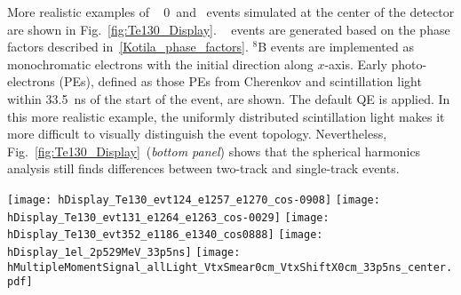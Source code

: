 More realistic examples of \Te~ 0\nbb~and \B~events simulated at the center of the detector are shown in Fig.~\ref{fig:Te130_Display}. 
\Te~ events are generated based on the phase factors described in~\ref{Kotila_phase_factors}.
$^{8}$B events are implemented as monochromatic electrons with the initial direction along $x$-axis.
Early photo-electrons (PEs), defined as those PEs from Cherenkov and scintillation light within 33.5~ns of the start of the event, are shown. 
The default QE is applied.  In this more realistic example, the uniformly distributed scintillation light makes it more difficult to 
visually distinguish the event topology. Nevertheless, Fig.~\ref{fig:Te130_Display}~(\emph{bottom panel}) shows that the spherical harmonics
analysis still finds differences between two-track and single-track events.

\begin{figure*}[h]
  \centering
  \texttt{[image: hDisplay\_Te130\_evt124\_e1257\_e1270\_cos-0908]}
  \texttt{[image: hDisplay\_Te130\_evt131\_e1264\_e1263\_cos-0029]}
  \texttt{[image: hDisplay\_Te130\_evt352\_e1186\_e1340\_cos0888]}
  \texttt{[image: hDisplay\_1el\_2p529MeV\_33p5ns]}
  \texttt{[image: hMultipleMomentSignal\_allLight\_VtxSmear0cm\_VtxShiftX0cm\_33p5ns\_center.pdf]} 
  \caption{ \emph{Top and middle rows:} Event display examples for {\Te} 0{\nbb}-decay signal and {\B} background events.
    The default QE and the time cut of 33.5~ns are applied to both Cherenkov (\emph{triangles}) and scintillation (\emph{crosses}) 
    photons. For the {\Te} 0{\nbb}-decay signal three representative events are shown each closely matching on of the three
    topologies. A typical single electron event is shown for the {\B} background.
    \emph{Top left:} $^{130}$Te 0{\nbb}-decay back-to-back electrons: $E_1$=1.257~MeV, $E_2$=1.270~MeV, 
    cos($\theta$)=-0.908. \emph{Top right:} $^{130}$Te 0{\nbb}-decay electrons at $\sim$90$^{\circ}$: $E_1$=1.264~MeV, $E_2$=1.263~MeV,
    cos($\theta$)=-0.029. \emph{Middle left:} $^{130}$Te 0{\nbb}-decay electrons at $\sim$0$^{\circ}$: $E_1$=1.186~MeV, $E_2$=1.340~MeV,
    cos($\theta$)=0.888. \emph{Middle right:} 2.529~MeV single electron. In all events electrons originate at the center of the detector.
    \emph{Bottom panel:} Normalized power spectrum $S_l$ calculated for distribution of all PE after the 33.5~ns time cut. 
    {\Te} 0{\nbb}-decay signal (\emph{solid red line}) and {\B} background (\emph{dashed blue line}) topologies are compared.
    Simulation of 1000 signal and background events. The normalized power values $S_l$'s were calculated for each individual event. 
    The horizontal lines correspond to the mean values of $S_l$. The vertical bars show one standard deviation 
    from the mean value.}
\label{fig:Te130_Display}
\end{figure*}


